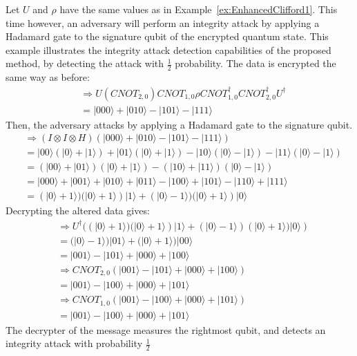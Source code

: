 \begin{example}
\label{ex:IntegrityAttackEnhancedClifford3}
	Let $U$ and $\rho$ have the same values as in Example~\ref{ex:EnhancedClifford1}. This time however, an adversary will perform an integrity attack by applying a Hadamard gate to the signature qubit of the encrypted quantum state. This example illustrates the integrity attack detection capabilities of the proposed method, by detecting the attack with $\frac{1}{2}$ probability. The data is encrypted the same way as before:
	\begin{align}
	& \Rightarrow U (\mathit{CNOT}_{2,0})\mathit{CNOT}_{1,0}\rho \mathit{CNOT}_{1,0}^{\dagger}\mathit{CNOT}_{2,0}^{\dagger} U^{\dagger}\\
	&= |000\rangle + |010\rangle - |101\rangle - |111\rangle
	\end{align}
	Then, the adversary attacks by applying a Hadamard gate to the signature qubit.
	\begin{align}
	& \Rightarrow (I \otimes I \otimes H)(|000\rangle + |010\rangle - |101\rangle - |111\rangle)\\
	&= |00\rangle(|0\rangle + |1\rangle) + |01\rangle(|0\rangle + |1\rangle) - |10\rangle(|0\rangle - |1\rangle) - |11\rangle(|0\rangle - |1\rangle)\\
	&= (|00\rangle + |01\rangle)(|0\rangle + |1\rangle) - (|10\rangle + |11\rangle)(|0\rangle - |1\rangle)\\
	&= |000\rangle + |001\rangle + |010\rangle + |011\rangle - |100\rangle + |101\rangle - |110\rangle + |111\rangle\\
	&= (|0\rangle + 1\rangle)(|0\rangle + 1\rangle)|1\rangle + (|0\rangle - 1\rangle)(|0\rangle + 1\rangle)|0\rangle
	\end{align}
	Decrypting the altered data gives:
	\begin{align}
	& \Rightarrow U^{\dagger}((|0\rangle + 1\rangle)(|0\rangle + 1\rangle)|1\rangle + (|0\rangle - 1\rangle)(|0\rangle + 1\rangle)|0\rangle)\\
	&= (|0\rangle - 1\rangle)|01\rangle + (|0\rangle + 1\rangle)|00\rangle\\
	&= |001\rangle - |101\rangle + |000\rangle + |100\rangle\\
	& \Rightarrow \mathit{CNOT}_{2,0} (|001\rangle - |101\rangle + |000\rangle + |100\rangle)\\
	&= |001\rangle - |100\rangle + |000\rangle + |101\rangle\\
	& \Rightarrow \mathit{CNOT}_{1,0} (|001\rangle - |100\rangle + |000\rangle + |101\rangle)\\
	&= |001\rangle - |100\rangle + |000\rangle + |101\rangle
	\end{align}
The decrypter of the message measures the rightmost qubit, and detects an integrity attack with probability $\frac{1}{2}$
\end{example}
